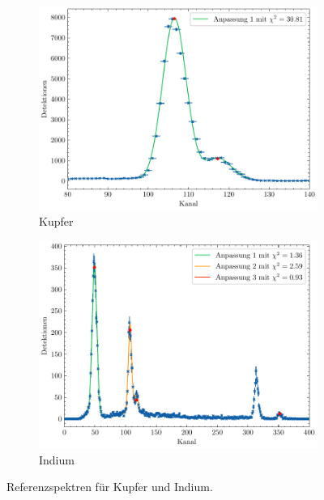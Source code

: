 \begin{figure}[H]
    \centering
    \begin{subfigure}{0.45\textwidth}
        \centering
        \includegraphics[width=\linewidth]{../figs/Cu}
        \caption{Kupfer}
    \end{subfigure}
    \begin{subfigure}{0.45\textwidth}
        \centering
        \includegraphics[width=\linewidth]{../figs/In}
        \caption{Indium}
    \end{subfigure}
    \caption{Referenzspektren für Kupfer und Indium.}\label{fig:cu_in}
\end{figure}
